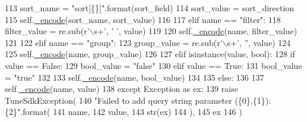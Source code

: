 \begin{DoxyCode}
113                     sort\_name = \textcolor{stringliteral}{"sort[\{\}]"}.format(sort\_field)
114                     sort\_value = sort\_direction
115                     self.\hyperlink{classtune_1_1management_1_1service_1_1query__string__builder_1_1QueryStringBuilder_a0b965e40a56591054bb62d0178bbe8b9}{\_encode}(sort\_name, sort\_value)
116 
117             \textcolor{keywordflow}{elif} name == \textcolor{stringliteral}{"filter"}:
118                 filter\_value = re.sub(\textcolor{stringliteral}{r'\(\backslash\)s+'}, \textcolor{stringliteral}{' '}, value)
119 
120                 self.\hyperlink{classtune_1_1management_1_1service_1_1query__string__builder_1_1QueryStringBuilder_a0b965e40a56591054bb62d0178bbe8b9}{\_encode}(name, filter\_value)
121 
122             \textcolor{keywordflow}{elif} name == \textcolor{stringliteral}{"group"}:
123                 group\_value = re.sub(\textcolor{stringliteral}{r'\(\backslash\)s+'}, \textcolor{stringliteral}{''}, value)
124 
125                 self.\hyperlink{classtune_1_1management_1_1service_1_1query__string__builder_1_1QueryStringBuilder_a0b965e40a56591054bb62d0178bbe8b9}{\_encode}(name, group\_value)
126 
127             \textcolor{keywordflow}{elif} isinstance(value, bool):
128                 \textcolor{keywordflow}{if} value == \textcolor{keyword}{False}:
129                     bool\_value = \textcolor{stringliteral}{"false"}
130                 \textcolor{keywordflow}{elif} value == \textcolor{keyword}{True}:
131                     bool\_value = \textcolor{stringliteral}{"true"}
132 
133                 self.\hyperlink{classtune_1_1management_1_1service_1_1query__string__builder_1_1QueryStringBuilder_a0b965e40a56591054bb62d0178bbe8b9}{\_encode}(name, bool\_value)
134 
135             \textcolor{keywordflow}{else}:
136 
137                 self.\hyperlink{classtune_1_1management_1_1service_1_1query__string__builder_1_1QueryStringBuilder_a0b965e40a56591054bb62d0178bbe8b9}{\_encode}(name, value)
138         \textcolor{keywordflow}{except} Exception \textcolor{keyword}{as} ex:
139             \textcolor{keywordflow}{raise} TuneSdkException(
140                 \textcolor{stringliteral}{"Failed to add query string parameter (\{0\},\{1\}): \{2\}"}.format(
141                     name,
142                     value,
143                     str(ex)
144                     ),
145                 ex
146             )

\end{DoxyCode}


